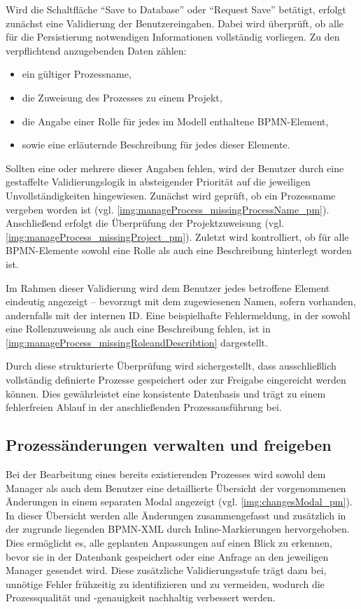 Wird die Schaltfläche \enquote{Save to Database} oder \enquote{Request Save} betätigt, erfolgt zunächst eine Validierung der Benutzereingaben. Dabei wird überprüft, ob alle für die Persistierung notwendigen Informationen vollständig vorliegen. Zu den verpflichtend anzugebenden Daten zählen:

\begin{itemize}
    \item ein gültiger Prozessname,  
    \item die Zuweisung des Prozesses zu einem Projekt,  
    \item die Angabe einer Rolle für jedes im Modell enthaltene BPMN-Element,  
    \item sowie eine erläuternde Beschreibung für jedes dieser Elemente.
\end{itemize}

Sollten eine oder mehrere dieser Angaben fehlen, wird der Benutzer durch eine gestaffelte Validierungslogik in absteigender Priorität auf die jeweiligen Unvollständigkeiten hingewiesen. Zunächst wird geprüft, ob ein Prozessname vergeben worden ist (vgl. \autoref{img:manageProcess_missingProcessName_pm}). Anschließend erfolgt die Überprüfung der Projektzuweisung (vgl. \autoref{img:manageProcess_missingProject_pm}). Zuletzt wird kontrolliert, ob für alle BPMN-Elemente sowohl eine Rolle als auch eine Beschreibung hinterlegt worden ist.

Im Rahmen dieser Validierung wird dem Benutzer jedes betroffene Element eindeutig angezeigt – bevorzugt mit dem zugewiesenen Namen, sofern vorhanden, andernfalls mit der internen ID. Eine beispielhafte Fehlermeldung, in der sowohl eine Rollenzuweisung als auch eine Beschreibung fehlen, ist in \autoref{img:manageProcess_missingRoleandDescribtion} dargestellt.


Durch diese strukturierte Überprüfung wird sichergestellt, dass ausschließlich vollständig definierte Prozesse gespeichert oder zur Freigabe eingereicht werden können. Dies gewährleistet eine konsistente Datenbasis und trägt zu einem fehlerfreien Ablauf in der anschließenden Prozessausführung bei.


\subsection*{Prozessänderungen verwalten und freigeben}
Bei der Bearbeitung eines bereits existierenden Prozesses wird sowohl dem Manager als auch dem Benutzer eine detaillierte Übersicht der vorgenommenen Änderungen in einem separaten Modal angezeigt (vgl. \autoref{img:changesModal_pm}). In dieser Übersicht werden alle Änderungen zusammengefasst und zusätzlich in der zugrunde liegenden BPMN-XML durch Inline-Markierungen hervorgehoben. Dies ermöglicht es, alle geplanten Anpassungen auf einen Blick zu erkennen, bevor sie in der Datenbank gespeichert oder eine Anfrage an den jeweiligen Manager gesendet wird. Diese zusätzliche Validierungsstufe trägt dazu bei, unnötige Fehler frühzeitig zu identifizieren und zu vermeiden, wodurch die Prozessqualität und -genauigkeit nachhaltig verbessert werden.


